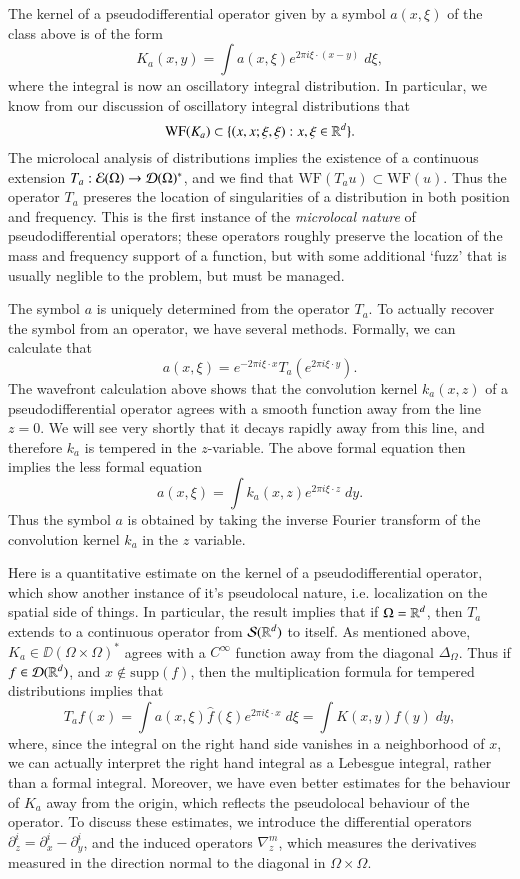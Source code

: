 The kernel of a pseudodifferential operator given by a symbol $a(x,\xi)$ of the class above is of the form
%
\[ K_a(x,y) = \int a(x,\xi) e^{2 \pi i \xi \cdot (x - y)}\; d\xi, \]
%
where the integral is now an oscillatory integral distribution. In particular, we know from our discussion of oscillatory integral distributions that
%
\[ \text{WF}(K_a) \subset \{ (x,x;\xi,\xi) : x, \xi \in \operatorname{\mathbb{R}}^d \}. \]
%
The microlocal analysis of distributions implies the existence of a continuous extension $T_a: \operatorname{\mathcal{E}}(\Omega) \to \operatorname{\mathcal{D}}(\Omega)^*$, and we find that $\text{WF}(T_au) \subset \text{WF}(u)$. Thus the operator $T_a$ preseres the location of singularities of a distribution in both position and frequency. This is the first instance of the \emph{microlocal nature} of pseudodifferential operators; these operators roughly preserve the location of the mass and frequency support of a function, but with some additional `fuzz' that is usually neglible to the problem, but must be managed.

The symbol $a$ is uniquely determined from the operator $T_a$. To actually recover the symbol from an operator, we have several methods. Formally, we can calculate that
%
\[ a(x,\xi) = e^{-2 \pi i \xi \cdot x} T_a(e^{2 \pi i \xi \cdot y}). \]
%
The wavefront calculation above shows that the convolution kernel $k_a(x,z)$ of a pseudodifferential operator agrees with a smooth function away from the line $z = 0$. We will see very shortly that it decays rapidly away from this line, and therefore $k_a$ is tempered in the $z$-variable. The above formal equation then implies the less formal equation
%
\[ a(x,\xi) = \int k_a(x,z) e^{2 \pi i \xi \cdot z}\; dy. \]
%
Thus the symbol $a$ is obtained by taking the inverse Fourier transform of the convolution kernel $k_a$ in the $z$ variable.

Here is a quantitative estimate on the kernel of a pseudodifferential operator, which show another instance of it's pseudolocal nature, i.e. localization on the spatial side of things. In particular, the result implies that if $\Omega = \operatorname{\mathbb{R}}^d$, then $T_a$ extends to a continuous operator from $\operatorname{\mathcal{S}}(\operatorname{\mathbb{R}}^d)$ to itself. As mentioned above, $K_a \in \DD(\Omega \times \Omega)^*$ agrees with a $C^\infty$ function away from the diagonal $\Delta_\Omega$. Thus if $f \in \operatorname{\mathcal{D}}(\operatorname{\mathbb{R}}^d)$, and $x \not \in \text{supp}(f)$, then the multiplication formula for tempered distributions implies that
%
\[ T_af(x) = \int a(x,\xi) \widehat{f}(\xi) e^{2 \pi i \xi \cdot x}\; d\xi = \int K(x,y) f(y)\; dy, \]
%
where, since the integral on the right hand side vanishes in a neighborhood of $x$, we can actually interpret the right hand integral as a Lebesgue integral, rather than a formal integral. Moreover, we have even better estimates for the behaviour of $K_a$ away from the origin, which reflects the pseudolocal behaviour of the operator. To discuss these estimates, we introduce the differential operators $\partial^i_z = \partial^i_x - \partial^i_y$, and the induced operators $\nabla^m_z$, which measures the derivatives measured in the direction normal to the diagonal in $\Omega \times \Omega$.

